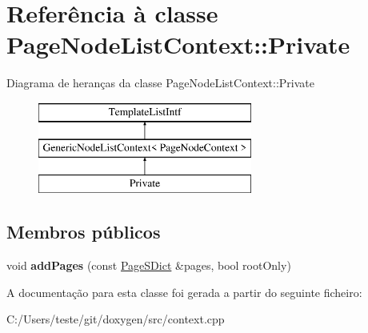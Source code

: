 \hypertarget{class_page_node_list_context_1_1_private}{\section{Referência à classe Page\-Node\-List\-Context\-:\-:Private}
\label{class_page_node_list_context_1_1_private}
}
Diagrama de heranças da classe Page\-Node\-List\-Context\-:\-:Private\begin{figure}[H]
\begin{center}
\leavevmode
\includegraphics[height=3.000000cm]{class_page_node_list_context_1_1_private}
\end{center}
\end{figure}
\subsection*{Membros públicos}
\begin{DoxyCompactItemize}
\item 
\hypertarget{class_page_node_list_context_1_1_private_ae6d822b481908008f8f97fe6d2c76528}{void {\bfseries add\-Pages} (const \hyperlink{class_page_s_dict}{Page\-S\-Dict} \&pages, bool root\-Only)}\label{class_page_node_list_context_1_1_private_ae6d822b481908008f8f97fe6d2c76528}

\end{DoxyCompactItemize}


A documentação para esta classe foi gerada a partir do seguinte ficheiro\-:\begin{DoxyCompactItemize}
\item 
C\-:/\-Users/teste/git/doxygen/src/context.\-cpp\end{DoxyCompactItemize}
